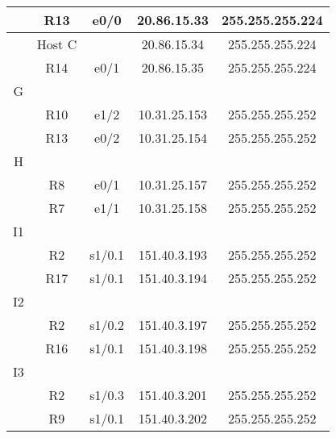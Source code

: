 \documentclass[12pt,a4paper,spanish]{article}
\begin{document}
\begin{tabular}{|c|c|c|c|c|}
	\hline
	  & R13 & e0/0 & 20.86.15.33 & 255.255.255.224 \\
	\hline
	  & Host C & & 20.86.15.34 & 255.255.255.224 \\
	\hline
	  & R14 & e0/1 & 20.86.15.35 & 255.255.255.224 \\
	\hline
	\hline
	G & & & & \\
	\hline
	  & R10 & e1/2 & 10.31.25.153 & 255.255.255.252 \\
	\hline
	  & R13 & e0/2 & 10.31.25.154 & 255.255.255.252 \\
	\hline
	\hline
	H & & & & \\
	\hline
	  & R8 & e0/1 & 10.31.25.157 & 255.255.255.252 \\
	\hline
	  & R7 & e1/1 & 10.31.25.158 & 255.255.255.252 \\
	\hline
	\hline
	I1 & & & & \\
	\hline
	  & R2 & s1/0.1 & 151.40.3.193 & 255.255.255.252 \\
	\hline
	  & R17 & s1/0.1 & 151.40.3.194 & 255.255.255.252 \\
	\hline
	\hline
	I2 & & & & \\
	\hline
	  & R2 & s1/0.2 & 151.40.3.197 & 255.255.255.252 \\
	\hline
	  & R16 & s1/0.1 & 151.40.3.198 & 255.255.255.252 \\
	\hline
	\hline
	I3 & & & & \\
	\hline
	  & R2 & s1/0.3 & 151.40.3.201 & 255.255.255.252 \\
	\hline
	  & R9 & s1/0.1 & 151.40.3.202 & 255.255.255.252 \\
	\hline
\end{tabular}
\newpage
\end{document}
